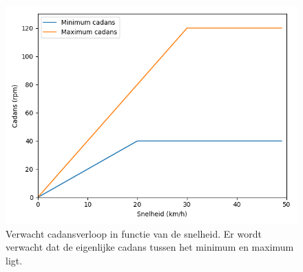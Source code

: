 \begin{figure}
  \includegraphics[width=\linewidth]{images/cadansverloop.png}
  \caption{Verwacht cadansverloop in functie van de snelheid. Er wordt verwacht dat de eigenlijke cadans tussen het minimum en maximum ligt.}
  \label{fig:cadansverloop}
\end{figure}
\newpage
